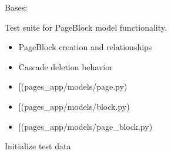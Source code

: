 \documentclass[letterpaper,10pt,english]{sphinxmanual}
\begin{document}

\begin{fulllineitems}
\label{\detokenize{pages_app.tests:pages_app.tests.test_models.PageBlockModelTest}}
\pysigstartsignatures
\pysiglinewithargsret
{}
{}
{}
\pysigstopsignatures
\sphinxAtStartPar
Bases: 

\sphinxAtStartPar
Test suite for PageBlock model functionality.
\begin{description}
\begin{itemize}
\item {} 
\sphinxAtStartPar
PageBlock creation and relationships

\item {} 
\sphinxAtStartPar
Cascade deletion behavior

\end{itemize}

\begin{itemize}
\item {} 
\sphinxAtStartPar
{[}\sphinxtitleref{Page}{]}(pages\_app/models/page.py)

\item {} 
\sphinxAtStartPar
{[}\sphinxtitleref{Block}{]}(pages\_app/models/block.py)

\item {} 
\sphinxAtStartPar
{[}\sphinxtitleref{PageBlock}{]}(pages\_app/models/page\_block.py)

\end{itemize}

\end{description}

\begin{fulllineitems}
\label{\detokenize{pages_app.tests:pages_app.tests.test_models.PageBlockModelTest.setUp}}
\pysigstartsignatures
\pysiglinewithargsret
{}
{}
{}
\pysigstopsignatures
\sphinxAtStartPar
Initialize test data


\end{fulllineitems}
\end{fulllineitems}
\end{document}
